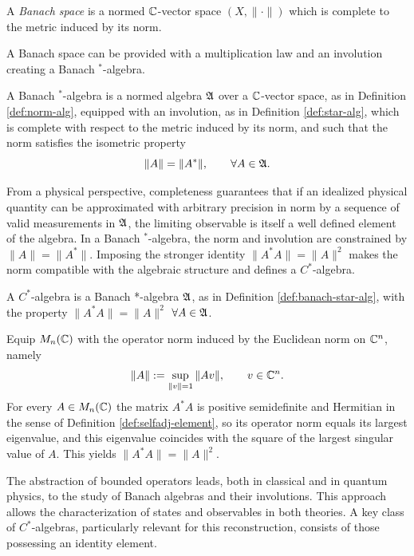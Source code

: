 	\begin{definition}\label{def:banach-space}
		A \emph{Banach space} is a normed $\mathbb{C}$-vector space $(X, \|\cdot\|)$ which is complete to the metric induced by its norm.
	\end{definition}
	
	\noindent A Banach space can be provided with a multiplication law and an involution creating a Banach $^*$-algebra.
	
	\begin{definition}\label{def:banach-star-alg}
		A Banach $^*$-algebra is a normed algebra $\mathfrak{A}$ over a $\mathbb{C}$-vector space, as in Definition \ref{def:norm-alg}, equipped with an involution, as in Definition \ref{def:star-alg}, which is complete with respect to the metric induced by its norm, and such that the norm satisfies the isometric property
		$$ \|A\| = \|A^*\|, \qquad \forall A \in \mathfrak{A}. $$
	\end{definition}
	
	From a physical perspective, completeness guarantees that if an idealized physical quantity can be approximated with arbitrary precision in norm by a sequence of valid measurements in $\mathfrak{A}$, the limiting observable is itself a well defined element of the algebra. In a Banach $^*$-algebra, the norm and involution are constrained by $\|A\|=\|A^*\|$. Imposing the stronger identity $\|A^*A\|=\|A\|^2$ makes the norm compatible with the algebraic structure and defines a $C^*$-algebra.
	
	\begin{definition}[$C^*$-algebra]\label{def:c-star-algebra}
		A $C^*$-algebra is a Banach *-algebra $\mathfrak{A}$, as in Definition \ref{def:banach-star-alg}, with the property $\|A^* A\| = \|A\|^2$ $\forall A \in \mathfrak{A}$.
	\end{definition}
	
	\begin{example}\label{ex:cstar-matrices}
		Equip $M_n(\mathbb{C})$ with the operator norm induced by the Euclidean norm on $\mathbb{C}^n$, namely
		\[
		\|A\| := \sup_{\|v\|=1} \|Av\|, \qquad v \in \mathbb{C}^n.
		\]
		For every $A \in M_n(\mathbb{C})$ the matrix $A^*A$ is positive semidefinite and Hermitian in the sense of Definition \ref{def:selfadj-element}, so its operator norm equals its largest eigenvalue, and this eigenvalue coincides with the square of the largest singular value of $A$. This yields $\|A^*A\| = \|A\|^2$.
	\end{example}
	
	The abstraction of bounded operators leads, both in classical and in quantum physics, to the study of Banach algebras and their involutions. This approach allows the characterization of states and observables in both theories. A key class of $C^*$-algebras, particularly relevant for this reconstruction, consists of those possessing an identity element.
	
